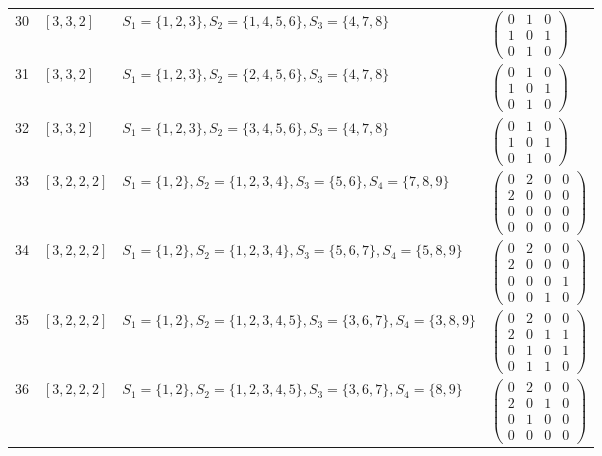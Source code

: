 \begin{longtable}{@{}r>{\raggedright\arraybackslash}p{1.5cm}>{\raggedright\arraybackslash}p{8.4cm}>{\raggedright\arraybackslash}p{4.2cm}@{}}
30 & $[3,3,2]$ & $S_{1}=\{1,2,3\}, S_{2}=\{1,4,5,6\}, S_{3}=\{4,7,8\}$ & $\left(\begin{smallmatrix}0 & 1 & 0\\1 & 0 & 1\\0 & 1 & 0\end{smallmatrix}\right)$ \\
31 & $[3,3,2]$ & $S_{1}=\{1,2,3\}, S_{2}=\{2,4,5,6\}, S_{3}=\{4,7,8\}$ & $\left(\begin{smallmatrix}0 & 1 & 0\\1 & 0 & 1\\0 & 1 & 0\end{smallmatrix}\right)$ \\
32 & $[3,3,2]$ & $S_{1}=\{1,2,3\}, S_{2}=\{3,4,5,6\}, S_{3}=\{4,7,8\}$ & $\left(\begin{smallmatrix}0 & 1 & 0\\1 & 0 & 1\\0 & 1 & 0\end{smallmatrix}\right)$ \\
33 & $[3,2,2,2]$ & $S_{1}=\{1,2\}, S_{2}=\{1,2,3,4\}, S_{3}=\{5,6\}, S_{4}=\{7,8,9\}$ & $\left(\begin{smallmatrix}0 & 2 & 0 & 0\\2 & 0 & 0 & 0\\0 & 0 & 0 & 0\\0 & 0 & 0 & 0\end{smallmatrix}\right)$ \\
34 & $[3,2,2,2]$ & $S_{1}=\{1,2\}, S_{2}=\{1,2,3,4\}, S_{3}=\{5,6,7\}, S_{4}=\{5,8,9\}$ & $\left(\begin{smallmatrix}0 & 2 & 0 & 0\\2 & 0 & 0 & 0\\0 & 0 & 0 & 1\\0 & 0 & 1 & 0\end{smallmatrix}\right)$ \\
35 & $[3,2,2,2]$ & $S_{1}=\{1,2\}, S_{2}=\{1,2,3,4,5\}, S_{3}=\{3,6,7\}, S_{4}=\{3,8,9\}$ & $\left(\begin{smallmatrix}0 & 2 & 0 & 0\\2 & 0 & 1 & 1\\0 & 1 & 0 & 1\\0 & 1 & 1 & 0\end{smallmatrix}\right)$ \\
36 & $[3,2,2,2]$ & $S_{1}=\{1,2\}, S_{2}=\{1,2,3,4,5\}, S_{3}=\{3,6,7\}, S_{4}=\{8,9\}$ & $\left(\begin{smallmatrix}0 & 2 & 0 & 0\\2 & 0 & 1 & 0\\0 & 1 & 0 & 0\\0 & 0 & 0 & 0\end{smallmatrix}\right)$ \\

\end{longtable}
